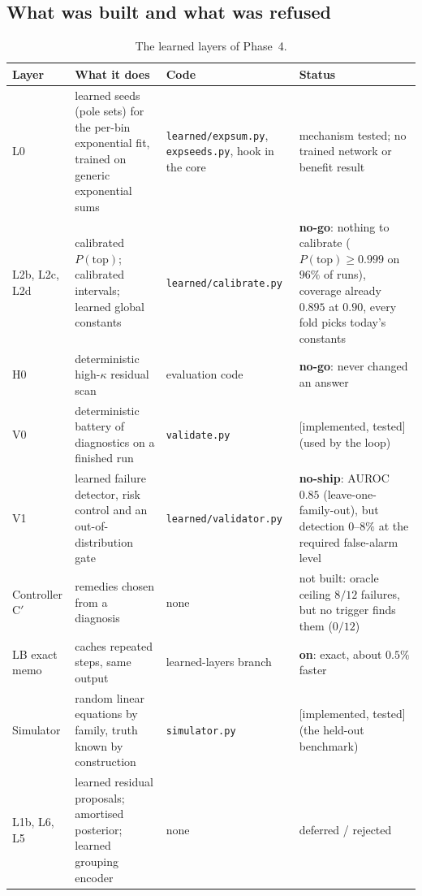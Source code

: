\documentclass[11pt,a4paper]{article}
\theoremstyle{definition}
\newcommand{\badge}[2]{\textcolor{#1}{\textsf{\footnotesize[#2]}}}
\newcommand{\impl}{\badge{cC}{implemented, tested}}
\begin{document}
\subsection{What was built and what was refused}
\begin{table}[!htb]
\centering\small
\begin{tabular}{@{}L{2.0cm}L{5.2cm}L{3.2cm}L{2.4cm}@{}}
\toprule
Layer & What it does & Code & Status\\\midrule
L0 & learned seeds (pole sets) for the per-bin exponential fit, trained on generic exponential sums & \texttt{learned/expsum.py}, \texttt{expseeds.py}, hook in the core & mechanism tested; no trained network or benefit result\\
L2b, L2c, L2d & calibrated $P(\text{top})$; calibrated intervals; learned global constants & \texttt{learned/}\allowbreak\texttt{calibrate.py} & \textbf{no-go}: nothing to calibrate ($P(\text{top})\ge0.999$ on $96\%$ of runs), coverage already $0.895$ at $0.90$, every fold picks today's constants\\
H0 & deterministic high-$\kappa$ residual scan & evaluation code & \textbf{no-go}: never changed an answer\\
V0 & deterministic battery of diagnostics on a finished run & \texttt{validate.py} & \impl{} (used by the loop)\\
V1 & learned failure detector, risk control and an out-of-distribution gate & \texttt{learned/}\allowbreak\texttt{validator.py} & \textbf{no-ship}: AUROC $0.85$ (leave-one-family-out), but detection $0$--$8\%$ at the required false-alarm level\\
Controller C$'$ & remedies chosen from a diagnosis & none & not built: oracle ceiling $8/12$ failures, but no trigger finds them ($0/12$)\\
LB exact memo & caches repeated steps, same output & learned-layers branch & \textbf{on}: exact, about $0.5\%$ faster\\
Simulator & random linear equations by family, truth known by construction & \texttt{simulator.py} & \impl{} (the held-out benchmark)\\
L1b, L6, L5 & learned residual proposals; amortised posterior; learned grouping encoder & none & deferred / rejected\\
\bottomrule
\end{tabular}
\caption{The learned layers of Phase~4.}
\end{table}
\end{document}
